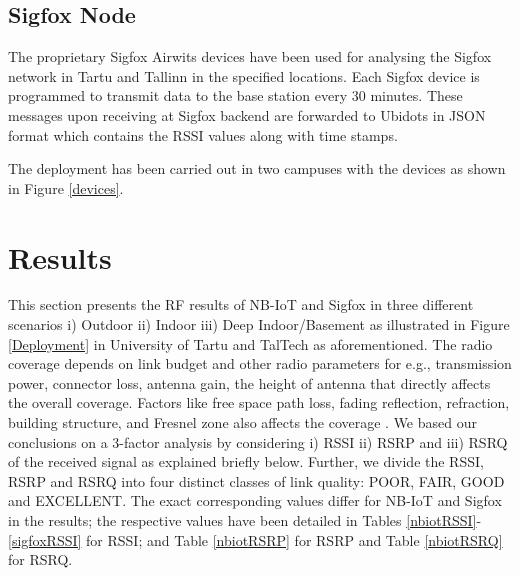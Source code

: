 \documentclass[conference,a4paper,xcolor=table]{IEEEtran}
\begin{document}
\subsection{Sigfox Node}
The proprietary Sigfox Airwits devices \cite{airwits} have been used for analysing the Sigfox network in Tartu and Tallinn in the specified locations. Each Sigfox device is programmed to transmit data to the base station every 30 minutes. These messages upon receiving at Sigfox backend are forwarded to Ubidots \cite{ubidots} in JSON format which contains the RSSI values along with time stamps.\par
The deployment has been carried out in two campuses with the devices as shown in Figure \ref{devices}.
 
 
\section{Results}\label{results} 

This section presents the RF results of NB-IoT and Sigfox in three different scenarios i) Outdoor ii) Indoor iii) Deep Indoor/Basement as illustrated in Figure \ref{Deployment} in University of Tartu and TalTech as aforementioned. The radio coverage depends on link budget and other radio parameters for e.g., transmission power, connector loss, antenna gain, the height of antenna that directly affects the overall coverage. Factors like free space path loss, fading reflection, refraction, building structure, and Fresnel zone also affects the coverage \cite{sikora2019test,sikora2019performance}. We based our conclusions on a 3-factor analysis by considering i) RSSI ii) RSRP and iii) RSRQ of the received signal as explained briefly below. Further, we divide the RSSI, RSRP and RSRQ into four distinct classes of link quality: POOR, FAIR, GOOD and EXCELLENT. The exact corresponding values differ for NB-IoT and Sigfox in the results; the respective values have been detailed in Tables  \ref{nbiotRSSI}-\ref{sigfoxRSSI} for RSSI; and Table \ref{nbiotRSRP} for RSRP and Table \ref{nbiotRSRQ} for RSRQ.
\end{document}
